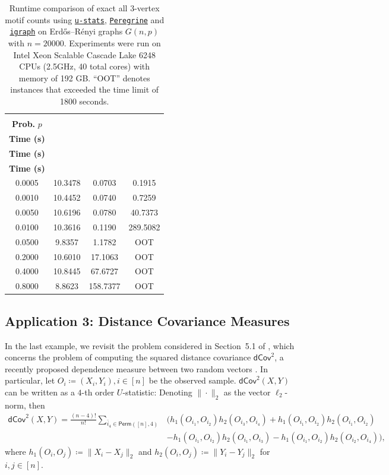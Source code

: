 \documentclass[sn-mathphys, natbib=false]{sn-jnl}
\newcommand{\libref}[2]{\href{#2}{\texttt{#1}}}
\def\package{\libref{u-stats}{https://github.com/zrq1706/U-Statistics-Python}}
\def\igraph{\libref{igraph}{https://igraph.org/}}
\theoremstyle{plain}
\theoremstyle{definition}
\newcommand{\perm}[1]{\mathsf{Perm}(#1)}
\def\package{\libref{u-stats}{https://github.com/zrq1706/U-Statistics-Python}}
\def\igraph{\libref{igraph}{https://igraph.org/}}
\def\peregrine{\libref{Peregrine}{https://github.com/pdclab/peregrine}}
\begin{document}
\begin{bibunit}[agsm]
\begin{table}[ht]
\centering
\caption{
Runtime comparison of exact all $3$-vertex motif counts using \package{}, \peregrine{} and \igraph{} on Erd\H{o}s--R\'enyi graphs $G(n, p)$ with $n = 20000$. 
Experiments were run on Intel Xeon Scalable Cascade Lake 6248 CPUs (2.5GHz, 40 total cores) with memory of 192 GB.
``OOT'' denotes instances that exceeded the time limit of 1800 seconds.
}
\label{tab:motif_counts_3}
\begin{tabular}{cccc}
\toprule
\makecell{\textbf{Edge} \\ \textbf{Prob.} $p$} & \makecell{\textbf{\package{}} \\ \textbf{Time (s)}} & \makecell{\textbf{\peregrine{}} \\ \textbf{Time (s)}} & \makecell{\textbf{\igraph{}} \\ \textbf{Time (s)}} \\
\midrule
0.0005 & 10.3478 & 0.0703 & 0.1915 \\
0.0010 & 10.4452 & 0.0740 & 0.7259 \\
0.0050 & 10.6196 & 0.0780 & 40.7373 \\
0.0100 & 10.3616 & 0.1190 & 289.5082 \\
0.0500 & 9.8357 & 1.1782 & OOT \\
0.2000 & 10.6010 & 17.1063 & OOT \\
0.4000 & 10.8445 & 67.6727 & OOT \\
0.8000 & 8.8623 & 158.7377 & OOT \\
\bottomrule
\end{tabular}
\end{table}

\subsection{Application 3: Distance Covariance Measures}
\label{sec:dependence}

In the last example, we revisit the problem considered in Section~5.1 of \citet{shao2025u}, which concerns the problem of computing the squared distance covariance $\mathsf{dCov}^2$, a recently proposed dependence measure between two random vectors \citep{szekely2007measuring, yao2018testing}. In particular, let $O_i \coloneqq (X_i, Y_i), i \in [n]$ be the observed sample. $\mathsf{dCov}^2 (X, Y)$ can be written as a $4$-th order $U$-statistic: Denoting $\|\cdot\|_2$ as the vector $\ell_2$-norm, then
\begin{align*}
    \mathsf{dCov}^2(X, Y) = \frac{(n - 4)!}{n!} \sum_{\bar{i}_{4} \in \perm{[n],4}} & \Bigg( h_1 (O_{i_1}, O_{i_2}) h_2 (O_{i_3}, O_{i_4}) + h_1 (O_{i_1}, O_{i_2}) h_2 (O_{i_1}, O_{i_2}) \\
    & - h_1 (O_{i_1}, O_{i_2}) h_2 (O_{i_1}, O_{i_3}) - h_1 (O_{i_1}, O_{i_2}) h_2 (O_{i_2}, O_{i_4}) \Bigg), 
\end{align*}
where $h_1 (O_i, O_j) \coloneqq \|X_i - X_j\|_2$ and $h_2 (O_i, O_j) \coloneqq \|Y_i - Y_j\|_2$ for $i, j \in [n]$. 


\end{bibunit}
\end{document}
